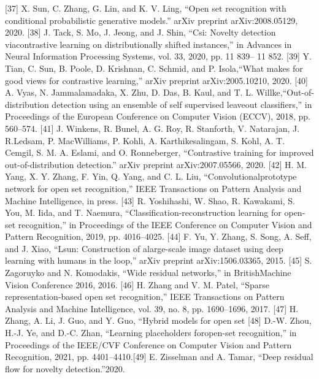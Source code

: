 \documentclass{gji}
\begin{document}
\begin{thebibliography}{}
 [37] X. Sun, C. Zhang, G. Lin, and K. V. Ling, “Open set recognition with conditional probabilistic generative models.” arXiv preprint arXiv:2008.05129, 2020.
 [38] J. Tack, S. Mo, J. Jeong, and J. Shin, “Csi: Novelty detection viacontrastive learning on distributionally shifted instances,” in Advances in Neural Information Processing Systems, vol. 33, 2020, pp. 11 839– 11 852.
 [39] Y. Tian, C. Sun, B. Poole, D. Krishnan, C. Schmid, and P. Isola,“What makes for good views for contrastive learning,” arXiv preprint arXiv:2005.10210, 2020.
 [40] A. Vyas, N. Jammalamadaka, X. Zhu, D. Das, B. Kaul, and T. L. Willke,“Out-of-distribution detection using an ensemble of self supervised leaveout classifiers,” in Proceedings of the European Conference on Computer Vision (ECCV), 2018, pp. 560–574.
 [41] J. Winkens, R. Bunel, A. G. Roy, R. Stanforth, V. Natarajan, J. R.Ledsam, P. MacWilliams, P. Kohli, A. Karthikesalingam, S. Kohl, A. T. Cemgil, S. M. A. Eslami, and O. Ronneberger, “Contrastive training for improved out-of-distribution detection.” arXiv preprint arXiv:2007.05566, 2020.
 [42] H. M. Yang, X. Y. Zhang, F. Yin, Q. Yang, and C. L. Liu, “Convolutionalprototype network for open set recognition,” IEEE Transactions on Pattern Analysis and Machine Intelligence, in press.
 [43] R. Yoshihashi, W. Shao, R. Kawakami, S. You, M. Iida, and T. Naemura, “Classification-reconstruction learning for open-set recognition,” in Proceedings of the IEEE Conference on Computer Vision and Pattern Recognition, 2019, pp. 4016–4025.
 [44] F. Yu, Y. Zhang, S. Song, A. Seff, and J. Xiao, “Lsun: Construction of alarge-scale image dataset using deep learning with humans in the loop,” arXiv preprint arXiv:1506.03365, 2015.
 [45] S. Zagoruyko and N. Komodakis, “Wide residual networks,” in BritishMachine Vision Conference 2016, 2016.
 [46] H. Zhang and V. M. Patel, “Sparse representation-based open set recognition,” IEEE Transactions on Pattern Analysis and Machine Intelligence, vol. 39, no. 8, pp. 1690–1696, 2017.
 [47] H. Zhang, A. Li, J. Guo, and Y. Guo, “Hybrid models for open set
 [48] D.-W. Zhou, H.-J. Ye, and D.-C. Zhan, “Learning placeholders foropen-set recognition,” in Proceedings of the IEEE/CVF Conference on Computer Vision and Pattern Recognition, 2021, pp. 4401–4410.[49] E. Zisselman and A. Tamar, “Deep residual flow for novelty detection.”2020. 

  
  
   
\end{thebibliography}


\appendix
\end{document}

